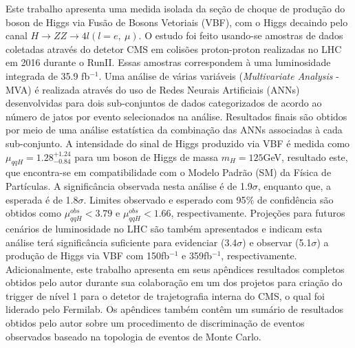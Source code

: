\documentclass[a4paper,12pt,oneside,onecolumn,final,fleqn]{repUERJ}
\begin{document}
Este trabalho apresenta uma medida isolada da seção de choque de produção do boson de Higgs via Fusão de Bosons Vetoriais (VBF), com o Higgs decaindo pelo canal $H \rightarrow ZZ \rightarrow 4l (l=e,~\mu)$. O estudo foi feito usando-se amostras de dados coletadas através do detetor CMS em colisões proton-proton realizadas no LHC em 2016 durante o RunII. Essas amostras correspondem à uma luminosidade integrada de 35.9 fb$^{-1}$. Uma análise de várias variáveis (\textit{Multivariate Analysis} - MVA) é realizada através do uso de Redes Neurais Artificiais (ANNs) desenvolvidas para dois sub-conjuntos de dados categorizados de acordo ao número de jatos por evento selecionados na análise. Resultados finais são obtidos por meio de uma análise estatística da combinação das ANNs associadas à cada sub-conjunto. A intensidade do sinal de Higgs produzido via VBF é medida como $\mu_{qqH} = 1.28^{+1.24}_{-0.84}$ para um boson de Higgs de massa $m_{H} = 125$GeV, resultado este, que encontra-se em compatibilidade com o Modelo Padrão (SM) da Física de Partículas. A significância observada nesta análise é de 1.9$\sigma$, enquanto que, a esperada é de 1.8$\sigma$. Limites observado e esperado com 95$\%$ de confidência são obtidos como $\mu_{qqH}^{obs} < 3.79$ e $\mu_{qqH}^{obs} < 1.66$, respectivamente. Projeções para futuros cenários de luminosidade no LHC são também apresentados e indicam esta análise terá significância suficiente para evidenciar (3.4$\sigma$) e observar (5.1$\sigma$) a produção de Higgs via VBF com 150fb$^{-1}$ e 359fb$^{-1}$, respectivamente. Adicionalmente, este trabalho apresenta em seus apêndices resultados completos obtidos pelo autor durante sua colaboração em um dos projetos para criação do trigger de nível 1 para o detetor de trajetografia interna do CMS, o qual foi liderado pelo Fermilab. Os apêndices também contêm um sumário de resultados obtidos pelo autor sobre um procedimento de discriminação de eventos observados baseado na topologia de eventos de Monte Carlo.

\imprimirchaves %
\end{document}
